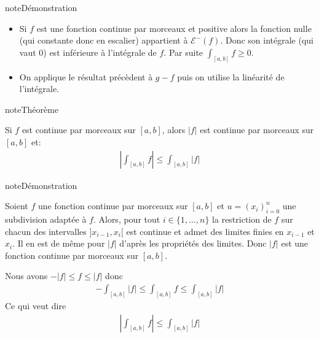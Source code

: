 \documentclass[letterpaper,10pt,french]{jupyterBook}
\begin{document}
\begin{sphinxadmonition}{note}{Démonstration}
\begin{itemize}
\item {} 
\sphinxAtStartPar
Si \(f\) est une fonction continue par morceaux et positive alors la fonction nulle (qui constante donc en escalier) appartient à \(\mathcal E^-(f)\). Donc son intégrale (qui vaut 0) est inférieure à l’intégrale de \(f\). Par suite \(\int_{[a, b]} f \geq 0\).

\item {} 
\sphinxAtStartPar
On applique le résultat précèdent à \(g-f\) puis on utilise la linéarité de l’intégrale.

\end{itemize}
\end{sphinxadmonition}

\begin{sphinxadmonition}{note}{Théorème}

\sphinxAtStartPar
Si \(f\) est continue par morceaux sur \([a, b]\), alors \(|f|\) est continue par morceaux sur \([a, b]\) et:
\begin{equation*}
\begin{split}
\left |\int_{[a, b]}f \right | \leq \int_{[a, b]}|f|
\end{split}
\end{equation*}\end{sphinxadmonition}

\begin{sphinxadmonition}{note}{Démonstration}

\sphinxAtStartPar
Soient \(f\) une fonction continue par morceaux sur \([a, b]\) et \(u=(x_i)_{i=0}^n\) une subdivision adaptée à \(f\). Alors, pour tout \(i \in \{1, \ldots, n\}\) la restriction de \(f\) sur chacun des intervalles \(]x_{i-1}, x_i[\) est continue et admet des limites finies en \(x_{i-1}\) et \(x_i\). Il en est de même pour \(|f|\) d’après les propriétés des limites. Donc \(|f|\) est une fonction continue par morceaux sur \([a, b]\).

\sphinxAtStartPar
Nous avons \(-|f| \leq f \leq |f|\) donc
\begin{equation*}
\begin{split}
- \int_{[a, b]}|f| \leq \int_{[a, b]}f \leq \int_{[a, b]}|f|  
\end{split}
\end{equation*}
\sphinxAtStartPar
Ce qui veut dire
\begin{equation*}
\begin{split}
\left| \int_{[a, b]}f \right | \leq \int_{[a, b]}|f|  
\end{split}
\end{equation*}\end{sphinxadmonition}
\end{document}

